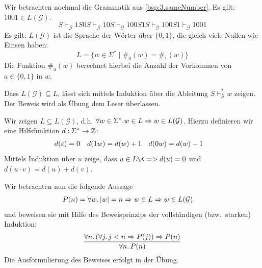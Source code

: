 \begin{Bsp}Wir betrachten nochmal die Grammatik aus \autoref{bsp:3.sameNumber}.
Es gilt: $1001\in L(\mathcal{G})$.
$$ S 
\vdash_\mathcal{G} 1S0S
\vdash_\mathcal{G} 10S
\vdash_\mathcal{G} 100S1S
\vdash_\mathcal{G} 100S1
\vdash_\mathcal{G} 1001
$$
Es gilt: $L(\mathcal{G})$ ist die Sprache der Wörter über $\{0,1\}$, die gleich viele Nullen wie Einsen haben:
  \begin{displaymath}
    L = \{ w \in \Sigma^* \mid \#_0(w) = \#_1(w)\}
  \end{displaymath}
  Die Funktion $\#_a(w)$ berechnet hierbei die Anzahl der Vorkommen von $a \in \{0, 1\}$ in $w$.

  Dass $L(\mathcal{G}) \subseteq L$, lässt sich mittels Induktion über
  die Ableitung $S \vdash^*_\mathcal{G} w$ zeigen. 
  Der Beweis wird als Übung dem Leser überlassen.

  Wir zeigen $L \subseteq L(\mathcal{G})$, d.h. $\forall w\in
  \Sigma^*. w \in L \=> w \in L(\mathcal{G})$.
  Hierzu definieren wir eine Hilfsfunktion $d : \Sigma^* \to \mathbb{Z}$:
  \begin{align*}
    d(\varepsilon) &= 0 &
    d(1w) &= d(w) + 1 &
    d(0w) &= d(w) - 1
  \end{align*}
  Mittels Induktion über $u$ zeige, dass $u \in L \<=>
  d(u) = 0$ und $d(u \cdot v) = d(u) + d(v)$. 
  
  Wir betrachten nun die folgende Aussage
  \begin{align*}
    P(n) &= \forall w.\, |w| = n \=> w \in L \=> w \in L(\mathcal{G})
           \text.
  \end{align*}
  und beweisen sie mit Hilfe des Beweisprinzips der vollständigen
  (bzw.\ starken) Induktion:
  \begin{gather*}
    \frac{
      \forall n.\, (\forall j.\, j<n \=> P(j)) \=> P(n)
    }{\forall n.\, P (n)}
  \end{gather*}
  Die Ausformulierung des Beweises erfolgt in der Übung.
\end{Bsp}
